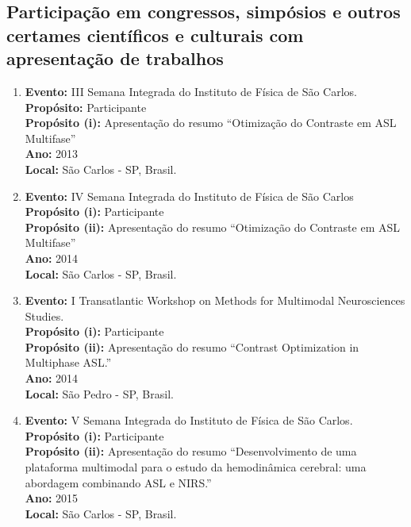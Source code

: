 \documentclass[a4paper,oneside,10pt]{article}
\begin{document}
\subsection{\large{Participação  em  congressos,  simpósios  e  outros  certames  científicos  e  culturais  com apresentação  de  trabalhos}}
\vspace{0.3cm}

\begin{enumerate}
\renewcommand{\labelenumi}{{\large\bfseries\arabic{enumi}.}}

\item   \textbf{Evento:} III Semana Integrada do Instituto de Física de São Carlos. \mbox{} \\
        \textbf{Propósito:} Participante\\
        \textbf{Propósito (i):} Apresentação do resumo ``Otimização do Contraste em ASL Multifase''\\
        \textbf{Ano:} 2013\\
        \textbf{Local:} São Carlos - SP, Brasil.

\item   \textbf{Evento:} IV Semana Integrada do Instituto de Física de São Carlos \mbox{} \\
        \textbf{Propósito (i):} Participante\\
        \textbf{Propósito (ii):} Apresentação do resumo ``Otimização do Contraste em ASL Multifase''\\
        \textbf{Ano:} 2014\\
        \textbf{Local:} São Carlos - SP, Brasil.

        \item   \textbf{Evento:} I Transatlantic Workshop on Methods for Multimodal Neurosciences Studies. \mbox{} \\
        \textbf{Propósito (i):} Participante\\
        \textbf{Propósito (ii):} Apresentação do resumo ``Contrast Optimization in Multiphase ASL.''\\
        \textbf{Ano:} 2014\\
        \textbf{Local:} São Pedro - SP, Brasil. 
        
        \item   \textbf{Evento:} V Semana Integrada do Instituto de Física de São Carlos. \mbox{} \\
        \textbf{Propósito (i):} Participante\\
        \textbf{Propósito (ii):} Apresentação do resumo ``Desenvolvimento de uma plataforma multimodal para o estudo da hemodinâmica cerebral: uma abordagem combinando ASL e NIRS.''\\
        \textbf{Ano:} 2015\\
        \textbf{Local:} São Carlos - SP, Brasil.


\end{enumerate}
\end{document}
